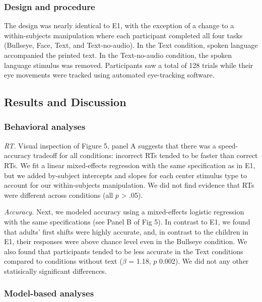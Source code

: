\documentclass[10pt, letterpaper]{article}
\begin{document}
\subsubsection{Design and procedure}\label{design-and-procedure-1}

The design was nearly identical to E1, with the exception of a change to
a within-subjects manipulation where each participant completed all four
tasks (Bullseye, Face, Text, and Text-no-audio). In the Text condition,
spoken language accompanied the printed text. In the Text-no-audio
condition, the spoken language stimulus was removed. Participants saw a
total of 128 trials while their eye movements were tracked using
automated eye-tracking software.

\subsection{Results and Discussion}\label{results-and-discussion-1}

\subsubsection{Behavioral analyses}\label{behavioral-analyses-1}

\emph{RT.} Visual inspection of Figure 5, panel A suggests that there
was a speed-accuracy tradeoff for all conditions: incorrect RTs tended
to be faster than correct RTs. We fit a linear mixed-effects regression
with the same specification as in E1, but we added by-subject intercepts
and slopes for each center stimulus type to account for our
within-subjects manipulation. We did not find evidence that RTs were
different across conditions (all \(p\) \textgreater{} .05).

\emph{Accuracy.} Next, we modeled accuracy using a mixed-effects
logistic regression with the same specifications (see Panel B of Fig 5).
In contrast to E1, we found that adults' first shifts were highly
accurate, and, in contrast to the children in E1, their responses were
above chance level even in the Bullseye condition. We also found that
participants tended to be less accurate in the Text conditions compared
to conditions without text (\(\beta\) = 1.18, \(p\) 0.002). We did not
any other statisically significant differences.

\subsubsection{Model-based analyses}\label{model-based-analyses-1}
\end{document}
